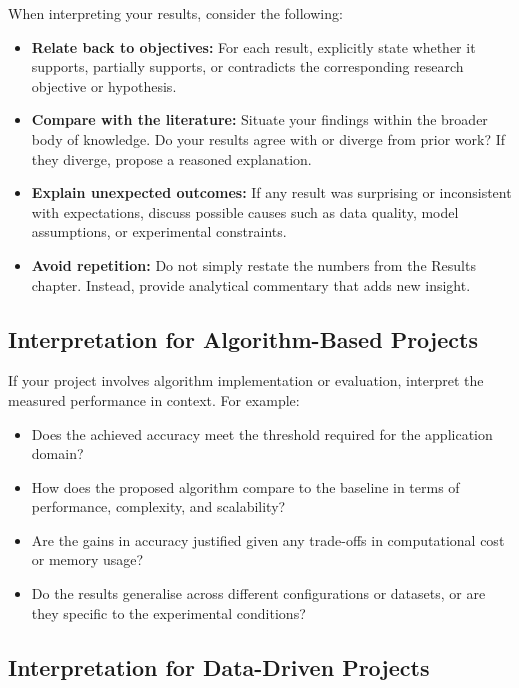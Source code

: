 When interpreting your results, consider the following:
\begin{itemize}
    \item \textbf{Relate back to objectives:} For each result, explicitly state
    whether it supports, partially supports, or contradicts the corresponding
    research objective or hypothesis.

    \item \textbf{Compare with the literature:} Situate your findings within the
    broader body of knowledge. Do your results agree with or diverge from prior
    work? If they diverge, propose a reasoned explanation.

    \item \textbf{Explain unexpected outcomes:} If any result was surprising or
    inconsistent with expectations, discuss possible causes such as data quality,
    model assumptions, or experimental constraints.

    \item \textbf{Avoid repetition:} Do not simply restate the numbers from the
    Results chapter. Instead, provide analytical commentary that adds new insight.
\end{itemize}

\subsection{Interpretation for Algorithm-Based Projects}
\label{subsec:algo-interpretation}

If your project involves algorithm implementation or evaluation, interpret the
measured performance in context. For example:
\begin{itemize}
    \item Does the achieved accuracy meet the threshold required for the
    application domain?
    \item How does the proposed algorithm compare to the baseline in terms of
    performance, complexity, and scalability?
    \item Are the gains in accuracy justified given any trade-offs in computational
    cost or memory usage?
    \item Do the results generalise across different configurations or datasets,
    or are they specific to the experimental conditions?
\end{itemize}

\subsection{Interpretation for Data-Driven Projects}
\label{subsec:data-interpretation}

